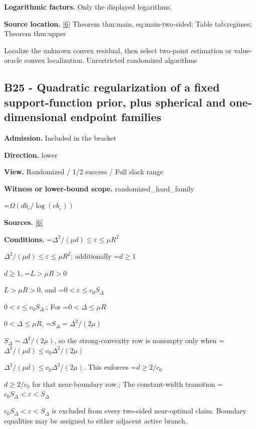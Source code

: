 \documentclass[10pt,a4paper]{article}
\newcommand{\AtlasMath}[1]{\par\begingroup\centering\setbox0=\hbox{$\displaystyle #1$}\ifdim\wd0>1.4\linewidth\typeout{ATLAS WIDE FORMULA: \the\wd0}\fi\ifdim\wd0>\linewidth\resizebox{\linewidth}{!}{\box0}\else\box0\fi\par\endgroup}
\newcommand{\AtlasInlineMath}[1]{\begingroup\setbox0=\hbox{$#1$}\ifdim\wd0>.4\linewidth\endgroup\AtlasMath{#1}\else\endgroup$#1$\fi}
\begin{document}
\textbf{Logarithmic factors.} Only the displayed logarithms.



\textbf{Source location.} \href{https://github.com/WU-Wendao/Colombo/blob/main/colombo_sensorium/Complexity_altas/data/sources/colombo/U10/manuscript.pdf}{[6]} Theorem thm:main, eq:main-two-sided; Table tab:regimes; Theorem thm:upper



Localize the unknown convex residual, then select two-point estimation or value-oracle convex localization. Unrestricted randomized algorithms



\subsection{B25 - Quadratic regularization of a fixed support-function prior, plus spherical and one-dimensional endpoint families}


\textbf{Admission.} Included in the bracket



\textbf{Direction.} lower



\textbf{View.} Randomized / 1/2 success / Full slack range



\textbf{Witness or lower-bound scope.} randomized\_hard\_family



\AtlasMath{\Omega(db_\varepsilon/\log(eb_\varepsilon))}


\textbf{Sources.} \href{https://github.com/WU-Wendao/Colombo/blob/main/colombo_sensorium/Complexity_altas/data/sources/colombo/U10/manuscript.pdf}{[6]}



\textbf{Conditions.} \AtlasInlineMath{\Delta^2/(\mu d)\le\varepsilon\le\mu R^2}; additionally \AtlasInlineMath{d\ge1}, \AtlasInlineMath{L>\mu R>0}, and \AtlasInlineMath{0<\varepsilon\le c_0S_\Delta}.; For \AtlasInlineMath{0<\Delta\le\mu R}, \AtlasInlineMath{S_\Delta=\Delta^2/(2\mu)}, so the strong-convexity row is nonempty only when \AtlasInlineMath{\Delta^2/(\mu d)\le c_0\Delta^2/(2\mu)}. This enforces \AtlasInlineMath{d\ge2/c_0} for that near-boundary row.; The constant-width transition \AtlasInlineMath{c_0S_\Delta<\varepsilon<S_\Delta} is excluded from every two-sided near-optimal claim. Boundary equalities may be assigned to either adjacent active branch.
\end{document}
